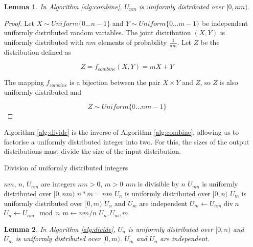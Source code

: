 \documentclass[12pt]{article}
\newtheorem{lemma}{Lemma}
\begin{document}
\begin{lemma}
In Algorithm \ref{alg:combine}, $U_{nm}$ is uniformly distributed over $[0,nm)$.
\label{lem:combine}
\end{lemma}

\begin{proof}
Let $X \sim Uniform \{0 ... n-1\}$ and $Y \sim Uniform\{0 ... m-1\}$ be independent uniformly distributed random variables. The joint distribution $(X,Y)$ is uniformly distributed with $nm$ elements of probability $\frac{1}{nm}$. Let $Z$ be the distribution defined as

\begin{equation}
Z = f_{combine}(X,Y) = mX+Y
\end{equation}

The mapping $f_{combine}$ is a bijection between the pair $X \times Y$ and $Z$, so $Z$ is also uniformly distributed and 

\begin{equation}
Z \sim Uniform \{0 ... nm-1\}
\end{equation}
\end{proof}

Algorithm \ref{alg:divide} is the inverse of Algorithm \ref{alg:combine}, allowing us to factorise a uniformly distributed integer into two. For this, the sizes of the output distributions must divide the size of the input distribution.

\begin{algorithm}
\caption{Division of uniformly distributed integers}
\label{alg:divide}
\begin{algorithmic}[1]
    \Require $nm$, $n$, $U_{nm}$ are integers
    \Require $nm>0$, $m>0$
    \Require $nm$ is divisible by $n$
    \Require $U_{mn}$ is uniformly distributed over $[0,nm)$
    \Ensure $n * m = nm$
    \Ensure $U_{n}$ is uniformly distributed over $[0,n)$
    \Ensure $U_{m}$ is uniformly distributed over $[0,m)$
    \Ensure $U_n$ and $U_m$ are independent
  \State $U_m \gets U_{nm} \operatorname{div} n$
  \State $U_{n} \gets U_{nm} \mod n$
  \State $m \gets nm / n$
  \State \Return $U_n, U_m, m$
\EndProcedure
\end{algorithmic}
\end{algorithm}

\begin{lemma}
In Algorithm \ref{alg:divide}, $U_n$ is uniformly distributed over $[0,n)$ and $U_m$ is uniformly distributed over $[0,m)$. $U_m$ and $U_n$ are independent.

\label{lem:divide}
\end{lemma}
\end{document}
